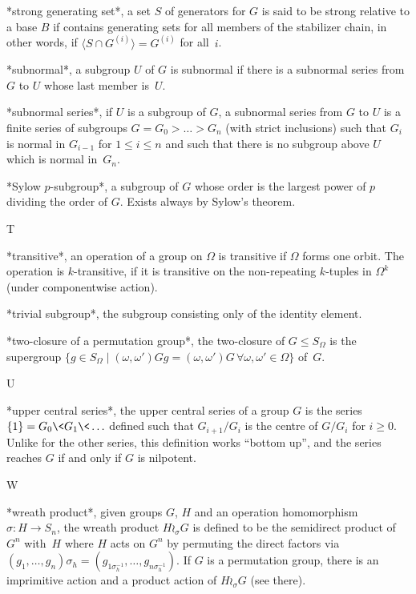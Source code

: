 *strong generating  set*, a set  $S$ of generators for $G$  is said to be
strong relative to a base $B$ if contains generating sets for all members
of the stabilizer chain, in other words, if $\langle S\cap G^{(i)}\rangle
= G^{(i)}$ for all~$i$.

*subnormal*, a subgroup $U$  of $G$ is  subnormal if there is a subnormal
series from $G$ to $U$ whose last member is~$U$.

*subnormal series*, if $U$ is a subgroup of $G$,  a subnormal series from
$G$ to $U$ is a finite series of subgroups $G = G_0 > \ldots > G_n$ (with
strict inclusions) such that  $G_i$  is normal  in $G_{i-1}$ for   $1\leq
i\leq n$ and  such that there is no  subgroup above  $U$ which is  normal
in~$G_n$.

*Sylow $p$-subgroup*, a subgroup of $G$  whose order is the largest power
of $p$ dividing the order of $G$. Exists always by Sylow's theorem.

 T

*transitive*,   an operation  of a  group  on $\Omega$  is  transitive if
$\Omega$ forms one   orbit. The operation   is $k$-transitive,  if it  is
transitive   on    the non-repeating   $k$-tuples in   $\Omega^k$  (under
componentwise action).

*trivial subgroup*, the subgroup consisting only of the identity element.

*two-closure of a permutation  group*, the two-closure of $G\le S_\Omega$
is   the  supergroup      $\{g\in S_\Omega\mid  (\omega,\omega')Gg      =
(\omega,\omega')G\,\forall \omega,\omega' \in\Omega\}$ of~$G$.

 U

*upper central  series*, the upper  central series of a  group $G$ is the
series $\{1\} =  G_0 \< G_1 \< \ldots$  defined such that $G_{i+1} / G_i$
is the centre of $G / G_i$ for $i\ge0$. Unlike for the other series, this
definition works ``bottom up'', and the series reaches $G$ if and only if
$G$ is nilpotent.

 W

*wreath product*, given  groups  $G$, $H$  and an operation  homomorphism
$\sigma\colon H\to S_n$, the wreath product $H\wr_\sigma G$ is defined to
be the semidirect product of  $G^n$ with~$H$ where  $H$ acts on $G^n$  by
permuting  the  direct    factors via~$(g_1,    \ldots,  g_n)\sigma_h   =
(g_{1\sigma_h^{-1}},   \ldots,   g_{n\sigma_h^{-1}})$.    If  $G$  is   a
permutation group, there is an imprimitive action and a product action of
$H\wr_\sigma G$ (see there).

